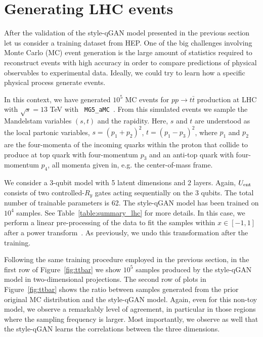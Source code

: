 \documentclass[twocolumn,preprintnumbers,superscriptaddress]{revtex4-2}
\begin{document}
\section{Generating LHC events}
\label{sec:lhc}

After the validation of the style-qGAN model presented in the previous section
let us consider a training dataset from HEP. One of the big challenges involving
Monte Carlo (MC) event generation is the large amount of statistics required to
reconstruct events with high accuracy in order to compare predictions of
physical observables to experimental data. Ideally, we could try
to learn how a specific physical process generate events.

In this context, we have generated $10^5$ MC events for $pp\rightarrow t\bar{t}$
production at LHC with $\sqrt{s} = 13$ TeV with {\tt
MG5\_aMC}~\cite{Alwall:2014hca,Frederix:2018nkq}. From this simulated events we
sample the Mandelstam variables $(s,t)$ and the rapidity. Here, $s$
and $t$ are understood as the local partonic variables,
$s=(p_1^{}+p_2^{})^2$, $t=(p_1^{}-p_3^{})_{}^2$, where $p_1^{}$ and
$p_2^{}$ are the four-momenta of the incoming quarks within the proton that collide to produce at top quark with four-momentum $p_3^{}$ and an anti-top quark with four-momentum $p_4^{}$, all momenta given in, e.g. the center-of-mass frame.

We consider a 3-qubit model with 5 latent dimensions and 2 layers. Again,
$U_{\rm ent}$ consists of two controlled-$R_{y}$ gates acting sequentially on
the 3 qubits. The total number of trainable parameters is 62. The style-qGAN
model has been trained on $10^4$ samples. See Table~\ref{table:summary_lhc} for more details. In this case, we perform a linear pre-processing of the data
to fit the samples within $x \in [-1, 1]$ after a power
transform~\cite{yeo2000new}. As previously, we undo this transformation after
the training.

Following the same training procedure employed in the previous section, in the
first row of Figure~\ref{fig:ttbar} we show $10^5$ samples produced by the
style-qGAN model in two-dimensional projections.
%
The second row of plots in Figure~\ref{fig:ttbar} shows the ratio between
samples generated from the prior original MC distribution and the style-qGAN
model. Again, even for this non-toy model, we observe a remarkably level of agreement, in particular in those regions
where the sampling frequency is larger. Most importantly, we observe as well that the style-qGAN learns
the correlations between the three dimensions.
\end{document}
